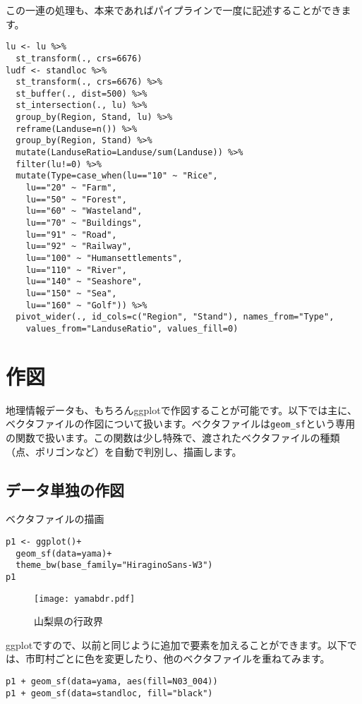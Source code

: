 この一連の処理も、本来であればパイプラインで一度に記述することができます。
\begin{verbatim}
lu <- lu %>%
  st_transform(., crs=6676)
ludf <- standloc %>%
  st_transform(., crs=6676) %>%
  st_buffer(., dist=500) %>%
  st_intersection(., lu) %>%
  group_by(Region, Stand, lu) %>%
  reframe(Landuse=n()) %>%
  group_by(Region, Stand) %>%
  mutate(LanduseRatio=Landuse/sum(Landuse)) %>%
  filter(lu!=0) %>%
  mutate(Type=case_when(lu=="10" ~ "Rice",
    lu=="20" ~ "Farm",
    lu=="50" ~ "Forest",
    lu=="60" ~ "Wasteland",
    lu=="70" ~ "Buildings",
    lu=="91" ~ "Road",
    lu=="92" ~ "Railway",
    lu=="100" ~ "Humansettlements",
    lu=="110" ~ "River",
    lu=="140" ~ "Seashore",
    lu=="150" ~ "Sea",
    lu=="160" ~ "Golf")) %>%
  pivot_wider(., id_cols=c("Region", "Stand"), names_from="Type",
    values_from="LanduseRatio", values_fill=0)
\end{verbatim}

\section{作図}
地理情報データも、もちろんggplotで作図することが可能です。以下では主に、ベクタファイルの作図について扱います。ベクタファイルは\verb|geom_sf|という専用の関数で扱います。この関数は少し特殊で、渡されたベクタファイルの種類（点、ポリゴンなど）を自動で判別し、描画します。
  \subsection{データ単独の作図}
\begin{itembox}[l]{ベクタファイルの描画}
\begin{verbatim}
p1 <- ggplot()+
  geom_sf(data=yama)+
  theme_bw(base_family="HiraginoSans-W3")
p1
\end{verbatim}
\end{itembox}
\begin{figure}[htb]
\begin{center}
\graphicspath{{2_gis/figs/}}
\texttt{[image: yamabdr.pdf]}\\
\caption{山梨県の行政界}
\label{yamabdr}
\end{center}
\end{figure}

ggplotですので、以前と同じように追加で要素を加えることができます。以下では、市町村ごとに色を変更したり、他のベクタファイルを重ねてみます。
\begin{verbatim}
p1 + geom_sf(data=yama, aes(fill=N03_004))
p1 + geom_sf(data=standloc, fill="black")
\end{verbatim}  

